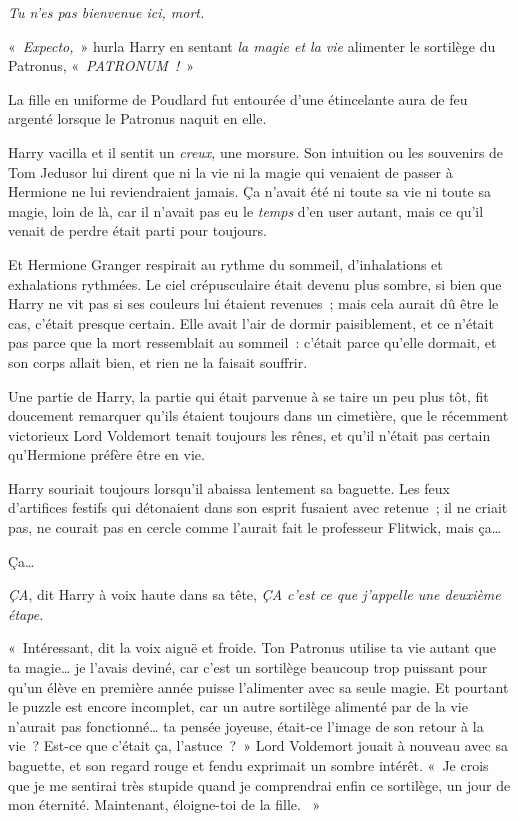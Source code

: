 \emph{Tu n'es pas bienvenue ici, mort.}

«~\emph{Expecto,}~» hurla Harry en sentant \emph{la magie et la vie} alimenter le sortilège du Patronus, «~\emph{PATRONUM~!}~»

La fille en uniforme de Poudlard fut entourée d'une étincelante aura de feu argenté lorsque le Patronus naquit en elle.

Harry vacilla et il sentit un \emph{creux}, une morsure.
Son intuition ou les souvenirs de Tom Jedusor lui dirent que ni la vie ni la magie qui venaient de passer à Hermione ne lui reviendraient jamais.
Ça n'avait été ni toute sa vie ni toute sa magie, loin de là, car il n'avait pas eu le \emph{temps} d'en user autant, mais ce qu'il venait de perdre était parti pour toujours.

Et Hermione Granger respirait au rythme du sommeil, d'inhalations et exhalations rythmées.
Le ciel crépusculaire était devenu plus sombre, si bien que Harry ne vit pas si ses couleurs lui étaient revenues~; mais cela aurait dû être le cas, c'était presque certain.
Elle avait l'air de dormir paisiblement, et ce n'était pas parce que la mort ressemblait au sommeil~: c'était parce qu'elle dormait, et son corps allait bien, et rien ne la faisait souffrir.

Une partie de Harry, la partie qui était parvenue à se taire un peu plus tôt, fit doucement remarquer qu'ils étaient toujours dans un cimetière, que le récemment victorieux Lord Voldemort tenait toujours les rênes, et qu'il n'était pas certain qu'Hermione préfère être en vie.

Harry souriait toujours lorsqu'il abaissa lentement sa baguette.
Les feux d'artifices festifs qui détonaient dans son esprit fusaient avec retenue~; il ne criait pas, ne courait pas en cercle comme l'aurait fait le professeur Flitwick, mais ça…

Ça…

\emph{ÇA}, dit Harry à voix haute dans sa tête, \emph{ÇA c'est ce que j'appelle une deuxième étape.}

«~Intéressant, dit la voix aiguë et froide.
Ton Patronus utilise ta vie autant que ta magie… je l'avais deviné, car c'est un sortilège beaucoup trop puissant pour qu'un élève en première année puisse l'alimenter avec sa seule magie.
Et pourtant le puzzle est encore incomplet, car un autre sortilège alimenté par de la vie n'aurait pas fonctionné… ta pensée joyeuse, était-ce l'image de son retour à la vie~?
Est-ce que c'était ça, l'astuce~?~»
Lord Voldemort jouait à nouveau avec sa baguette, et son regard rouge et fendu exprimait un sombre intérêt.
«~Je crois que je me sentirai très stupide quand je comprendrai enfin ce sortilège, un jour de mon éternité.
Maintenant, éloigne-toi de la fille.
~»

